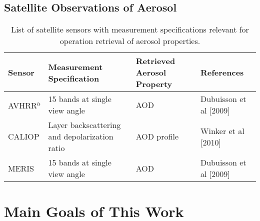 \subsection{Satellite Observations of Aerosol}

\begin{table}[h]
  \centering
  \small
  \caption{List of satellite sensors with measurement specifications 
  relevant for operation retrieval of aerosol properties.}
  \label{tab:satellites}
  \begin{tabular}{p{}p{}p{}p{}}\toprule
    Sensor & Measurement Specification  & Retrieved Aerosol Property & References \\ \midrule
    AVHRR\textsuperscript{a}  & 15 bands at single view angle & AOD & Dubuisson et al [2009] \\
    CALIOP & Layer backscattering and depolarization ratio & AOD profile & Winker et al [2010] \\
    MERIS  & 15 bands at single view angle & AOD & Dubuisson et al [2009] \\ \bottomrule
  \end{tabular}
\end{table}

\section{Main Goals of This Work}

